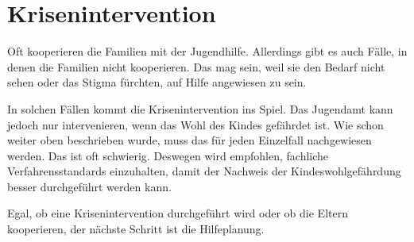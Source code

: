 \documentclass{ejsreport}
\begin{document}
\section{Krisenintervention}

Oft kooperieren die Familien mit der Jugendhilfe. 
Allerdings gibt es auch Fälle, in denen die Familien nicht kooperieren. 
Das mag sein, weil sie den Bedarf nicht sehen oder das Stigma fürchten, 
auf Hilfe angewiesen zu sein.

In solchen Fällen kommt die Krisenintervention ins Spiel. 
Das Jugendamt kann jedoch nur intervenieren, 
wenn das Wohl des Kindes gefährdet ist. 
Wie schon weiter oben beschrieben wurde, 
muss das für jeden Einzelfall nachgewiesen werden. 
Das ist oft schwierig. 
Deswegen wird empfohlen, fachliche Verfahrensstandards einzuhalten, 
damit der Nachweis der Kindeswohlgefährdung 
besser durchgeführt werden kann.

Egal, ob eine Krisenintervention durchgeführt wird 
oder ob die Eltern kooperieren, der nächste Schritt ist die Hilfeplanung.

\printbibliography
\end{document}
